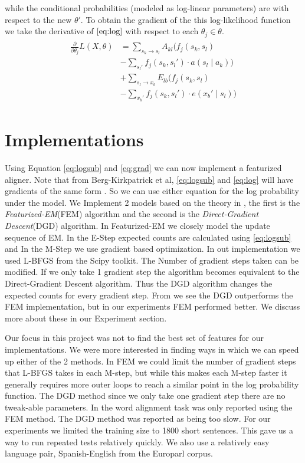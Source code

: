 \documentclass[11pt,letterpaper]{article}
\begin{document}
while the conditional probabilities (modeled as log-linear parameters) are with
respect to the new $\theta'$. To obtain the gradient of the this log-likelihood
function we take the derivative of $\eqref{eq:log}$ with respect to each
$\theta_j \in \theta$.
\begin{align}
\begin{split}
\frac{\partial}{\partial\theta_j} L(X,\theta) &=  \sum_{s_k \rightarrow s_l} A_{kl}
(f_j(s_k, s_l) \\ &- \sum_{s_l'} f_j(s_k,s_l') \cdot a(s_l\mid a_k)) \\ & +
\sum_{s_l \rightarrow x_b} E_{lb}(f_j(s_k, s_l) \\ & - \sum_{x_b'} f_j(s_k,s_l')
\cdot e(x_b' \mid s_l)) \label{eq:grad}
\end{split}
\end{align}

\section{Implementations}
Using Equation \ref{eq:logsub} and \ref{eq:grad} we can now implement a featurized aligner. Note that from Berg-Kirkpatrick et al, \ref{eq:logsub} and \ref{eq:log} will have gradients of the same form \cite{berg2010painless}. So we can use either equation for the log probability under the model. We Implement 2 models based on the theory in \cite{berg2010painless}, the first is the \textit{Featurized-EM}(FEM) algorithm and the second is the \textit{Direct-Gradient Descent}(DGD) algorithm. In Featurized-EM we closely model the update sequence of EM. In the E-Step expected counts are calculated using \ref{eq:logsub} and In the M-Step we use gradient based optimization. In out implementation we used L-BFGS from the Scipy toolkit. The Number of gradient steps taken can be modified. If we only take 1 gradient step the algorithm becomes equivalent to the Direct-Gradient Descent algorithm. Thus the DGD algorithm changes the expected counts for every gradient step. From \cite{berg2010painless} we see the DGD outperforms the FEM implementation, but in our experiments FEM performed better. We discuss more about these in our Experiment section.

Our focus in this project was not to find the best set of features for our implementations. We were more interested in finding ways in which we can speed up either of the 2 methods. In FEM we could limit the number of gradient steps that L-BFGS takes in each M-step, but while this makes each M-step faster it generally requires more outer loops to reach a similar point in the log probability function. The DGD method since we only take one gradient step there are no tweak-able parameters. In \cite{berg2010painless} the word alignment task was only reported using the FEM method. The DGD method was reported as being too slow. For our experiments we limited the training size to 1800 short sentences. This gave us a way to run repeated tests relatively quickly. We also use a relatively easy language pair, Spanish-English from the Europarl corpus. 
\end{document}
